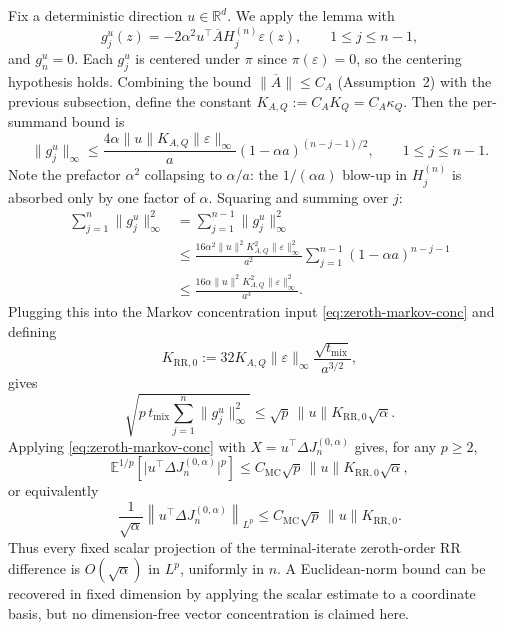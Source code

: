 Fix a deterministic direction $u\in\mathbb{R}^d$. We apply the lemma with
\[
  g_j^u(z)
    =-2\alpha^2u^\top\overline{A}H_j^{(n)}\varepsilon(z),
  \qquad 1\leq j\leq n-1,
\]
and $g_n^u=0$. Each $g_j^u$ is centered under $\pi$ since
$\pi(\varepsilon)=0$, so the centering hypothesis holds. Combining the bound
$\lVert\overline{A}\rVert\leq C_A$ (Assumption~2) with the previous
subsection, define the constant
$K_{A,Q}:=C_AK_Q=C_A\kappa_Q$. Then the per-summand bound is
\[
  \lVert g_j^u\rVert_\infty
    \leq
    \frac{4\alpha\lVert u\rVert K_{A,Q}
          \lVert\varepsilon\rVert_\infty}{a}
    (1-\alpha a)^{(n-j-1)/2},
  \qquad 1\leq j\leq n-1.
\]
Note the prefactor $\alpha^2$ collapsing to $\alpha/a$: the
$1/(\alpha a)$ blow-up in $H_j^{(n)}$ is absorbed only by one factor of
$\alpha$. Squaring and summing over $j$:
\[
  \begin{aligned}
    \sum_{j=1}^n\lVert g_j^u\rVert_\infty^2
      &=\sum_{j=1}^{n-1}\lVert g_j^u\rVert_\infty^2 \\
      &\leq\frac{16\alpha^2\lVert u\rVert^2K_{A,Q}^2
                    \lVert\varepsilon\rVert_\infty^2}{a^2}
        \sum_{j=1}^{n-1}(1-\alpha a)^{n-j-1} \\
      &\leq\frac{16\alpha\lVert u\rVert^2K_{A,Q}^2
                    \lVert\varepsilon\rVert_\infty^2}{a^3}.
  \end{aligned}
\]
Plugging this into the Markov concentration input
\eqref{eq:zeroth-markov-conc} and defining
\[
  K_{\mathrm{RR},0}
    :=32K_{A,Q}\lVert\varepsilon\rVert_\infty
      \frac{\sqrt{t_{\mathrm{mix}}}}{a^{3/2}},
\]
gives
\[
  \sqrt{p\,t_{\mathrm{mix}}
    \sum_{j=1}^n\lVert g_j^u\rVert_\infty^2}
    \leq\sqrt{p}\,\lVert u\rVert K_{\mathrm{RR},0}\sqrt{\alpha}.
\]
Applying \eqref{eq:zeroth-markov-conc} with
$X=u^\top\Delta J_n^{(0,\alpha)}$ gives, for any $p\geq2$,
\[
  \mathbb{E}^{1/p}\!\left[
    \lvert u^\top\Delta J_n^{(0,\alpha)}\rvert^p
  \right]
  \leq C_{\mathrm{MC}}\sqrt{p}\,\lVert u\rVert
    K_{\mathrm{RR},0}\sqrt{\alpha},
\]
or equivalently
\[
  \frac{1}{\sqrt{\alpha}}
  \left\lVert u^\top\Delta J_n^{(0,\alpha)}\right\rVert_{L^p}
  \leq C_{\mathrm{MC}}\sqrt{p}\,\lVert u\rVert K_{\mathrm{RR},0}.
\]
Thus every fixed scalar projection of the terminal-iterate zeroth-order RR
difference is $O(\sqrt{\alpha})$ in $L^p$, uniformly in $n$. A
Euclidean-norm bound can be recovered in fixed dimension by applying the
scalar estimate to a coordinate basis, but no dimension-free vector
concentration is claimed here.
